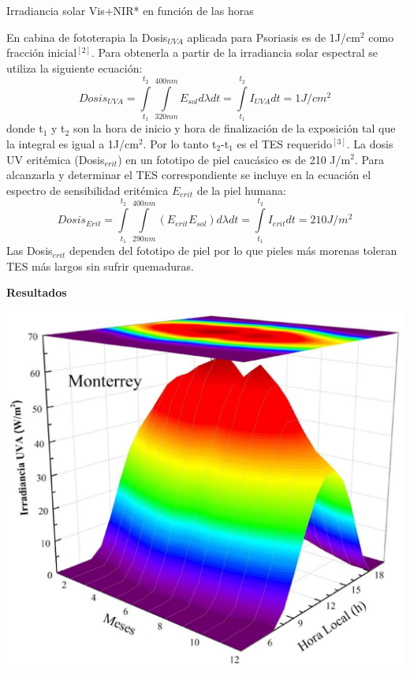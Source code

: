 \documentclass{article}
\begin{document}
\begin{multicols}{2}
\begin{center}
\begin{minipage}{0.47\linewidth}
\begin{center}
\textcolor{na}{Irradiancia solar Vis+NIR* en función de las horas}
\end{center}
\end{minipage}
\end{center}
En cabina de fototerapia la Dosis$_{UVA}$ aplicada para Psoriasis es de 1J/cm$^2$ como fracción inicial$^{\left[2 \right]} $. Para obtenerla a partir de la irradiancia solar espectral se utiliza la siguiente ecuación:
\begin{equation*}
    Dosis_{UVA}=\int\limits_{t_1}^{t_2} \int\limits_{320nm}^{400nm} E_{sol}d\lambda dt= \int\limits_{t_1}^{t_2}I_{UVA}dt=1J/cm^2
\end{equation*}
donde t$_1$ y t$_2$ son la hora de inicio y hora de finalización de la exposición tal que la integral es igual a 1J/cm$^2$. Por lo tanto t$_2$-t$_1$ es el TES requerido$^{\left[3 \right]} $. La dosis UV eritémica (Dosis$_{erit}$) en un fototipo de piel caucásico es de 210 J/m$^2$. Para alcanzarla y determinar el TES correspondiente se incluye en la ecuación el espectro de sensibilidad eritémica $E_{erit}$ de la piel humana:
\begin{equation*}
    Dosis_{Erit}=\int\limits_{t_1}^{t_2} \int\limits_{290nm}^{400nm} \left( E_{erit}E_{sol}\right)d\lambda dt = \int\limits_{t_1}^{t_2}I_{erit}dt=210J/m^2
\end{equation*}
Las Dosis$_{erit}$ dependen del fototipo de piel por lo que pieles más morenas toleran TES más largos sin sufrir quemaduras.
\begin{center}
\begin{shaded}
\textbf{\textcolor{na}{Resultados}}
\end{shaded}
\end{center}
\vspace{-0.2cm}
\includegraphics[scale=0.39]{images/pro.eps}\\

\end{multicols}
\end{document}

